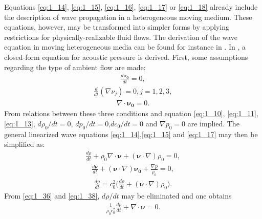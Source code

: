         Equations \ref{eq:1_14}, \ref{eq:1_15}, \ref{eq:1_16}, \ref{eq:1_17} or \ref{eq:1_18} already include the description of wave propagation in a
heterogeneous moving medium. These equations, however, may be transformed into simpler forms by applying restrictions for physically-realizable fluid flows.
        The derivation of the wave equation in moving heterogeneous media can be found for instance in \cite{VladimirE.Ostashev2015AcousticsMovingInhomogeneous}.
        In \cite{Godin2011Anexactwave}, a closed-form equation for acoustic pressure is derived.
First, some assumptions regarding the type of ambient flow are made:
        \begin{align} \label{eq:1_33}
            \frac{d \bm{\nu_0}}{d t} = 0,
        \end{align}
\vspace*{-7mm}
        \begin{align} \label{eq:1_34}
            \frac{d}{d t}(\nabla\nu_j)=0, j= 1,2,3,
        \end{align}
\vspace*{-7mm}
        \begin{align} \label{eq:1_35}
            \nabla\cdot\bm{\nu_0}=0.
        \end{align}
        From relations between these three conditions and equation \ref{eq:1_10}, \ref{eq:1_11}, \ref{eq:1_13}, $d\rho_0/d t=0$, $d p_0/d t=0$,$dc_0/d t=0$ and
$\nabla p_0=0$  are implied. The general linearized wave equations \ref{eq:1_14},\ref{eq:1_15} and \ref{eq:1_17} may then be simplified as:
        \begin{align} \label{eq:1_36}
            \frac{d \rho}{d t}+\rho_0\nabla\cdot\bm{\nu}+(\bm{\nu}\cdot\nabla)\rho_0= 0,
        \end{align}
\vspace*{-7mm}
        \begin{align} \label{eq:1_37}
            \frac{d\bm{\nu}}{d t}+(\bm{\nu}\cdot\nabla)\bm{\nu_0}+\frac{\nabla p}{\rho_0}=0,
        \end{align}
\vspace*{-7mm}
        \begin{align} \label{eq:1_38}
            \frac{d p}{d t}=c_0^2\biggl( \frac{d \rho}{d t}+(\bm{\nu}\cdot\nabla)\rho_0 \biggr).
        \end{align}
        From \ref{eq:1_36} and \ref{eq:1_38}, $d \rho/d t$ may be eliminated and one obtains
        \begin{align} \label{eq:1_39}
            \frac{1}{\rho_0 c_0^2}\frac{d p}{d t}+\nabla\cdot\bm{\nu}=0.
        \end{align}

